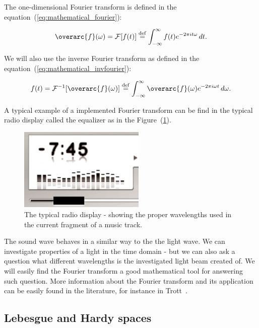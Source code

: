 \documentclass[12pt,twoside,a4paper]{article}
\numberwithin{equation}{subsection}
\numberwithin{figure}{subsection}
\begin{document}
The one-dimensional Fourier transform is defined in the equation~(\ref{eq:mathematical_fourier}):

\begin{equation} \label{eq:mathematical_fourier}
  \overarc{f}(\omega) = \mathcal{F}[f(t)] \stackrel{\mathrm{def}}{=} \int_{- \infty} ^ {\infty} f(t) e ^{-2 \pi i t \omega} \, dt .
\end{equation}

We will also use the inverse Fourier transform as defined in the equation~(\ref{eq:mathematical_invfourier}):

\begin{equation} \label{eq:mathematical_invfourier}
  f(t) = \mathcal{F}^{-1}[\overarc{f}(\omega)] \stackrel{\mathrm{def}}{=} \int_{- \infty} ^ {\infty} \overarc{f}(\omega) e ^{-2 \pi i
  \omega t} \, d\omega .
\end{equation}

A typical example of a implemented Fourier transform can be find in the typical radio display called the equalizer as in the
Figure~(\ref{fig:mathematical_equalizer}).

\begin{figure} 
	\begin{center}
 		\includegraphics[width=60mm]{img/equalizer.png}
 		\caption{The typical radio display - showing the proper wavelengths used in the current fragment of a music track.
 		\label{fig:mathematical_equalizer}}
	\end{center}
\end{figure} 

The sound wave behaves in a similar way to the the light wave. We can investigate properties of a light in the time domain - but we can also
ask a question what different wavelengths is the investigated light beam created of. We will easily find the Fourier transform a good
mathematical tool for answering such question. More information about the Fourier transform and its application can be easily found in the
literature, for instance in Trott~\cite{trott_mathematica}.

\subsection{Lebesgue and Hardy spaces}
\end{document}
